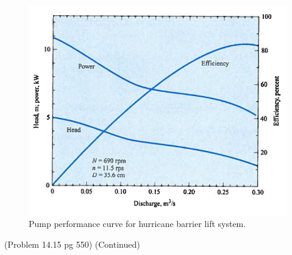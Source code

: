 \documentclass[12pt]{article}
\begin{document}
\begin{enumerate}
\begin{figure}[htbp] %
   \centering
   \includegraphics[width=5in]{PumpCurve.jpg} 
   \caption{Pump performance curve for hurricane barrier lift system.}
   \label{fig:PumpCurve}
\end{figure}

\clearpage
(Problem 14.15 pg 550) (Continued)

\end{enumerate}
\end{document}
